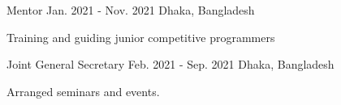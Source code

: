 

\begin{cventries}

  \cventry
    {} %
    {Mentor} %
    {Jan. 2021 - Nov. 2021} %
    {Dhaka, Bangladesh} %
    {
      \begin{cvitems} %
        \item {Training and guiding junior competitive programmers}
      \end{cvitems}
    }

  \cventry
    {} %
    {Joint General Secretary} %
    {Feb. 2021 - Sep. 2021} %
    {Dhaka, Bangladesh} %
    {
      \begin{cvitems} %
        \item {Arranged seminars and events.}
      \end{cvitems}
    }

\end{cventries}
